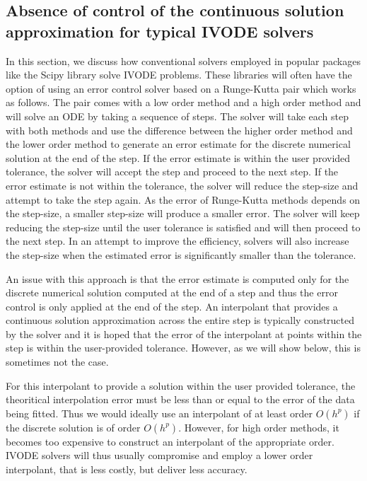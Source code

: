 \subsection{Absence of control of the continuous solution approximation for typical IVODE solvers}
\label{section:end_of_step_innacurate}
In this section, we discuss how conventional solvers employed in popular packages like the Scipy library solve IVODE problems. These libraries will often have the option of using an error control solver based on a Runge-Kutta pair which works as follows. The pair comes with a low order method and a high order method and will solve an ODE by taking a sequence of steps. The solver will take each step with both methods and use the difference between the higher order method and the lower order method to generate an error estimate for the discrete numerical solution at the end of the step. If the error estimate is within the user provided tolerance, the solver will accept the step and proceed to the next step. If the error estimate is not within the tolerance, the solver will reduce the step-size and attempt to take the step again. As the error of Runge-Kutta methods depends on the step-size, a smaller step-size will produce a smaller error. The solver will keep reducing the step-size until the user tolerance is satisfied and will then proceed to the next step. In an attempt to improve the efficiency, solvers will also increase the step-size when the estimated error is significantly smaller than the tolerance.

An issue with this approach is that the error estimate is computed only for the discrete numerical solution computed at the end of a step and thus the error control is only applied at the end of the step. An interpolant that provides a continuous solution approximation across the entire step is typically constructed by the solver and it is hoped that the error of the interpolant at points within the step is within the user-provided tolerance. However, as we will show below, this is sometimes not the case.

For this interpolant to provide a solution within the user provided tolerance, the theoritical interpolation error must be less than or equal to the error of the data being fitted. Thus we would ideally use an interpolant of at least order $O(h^{p})$ if the discrete solution is of order $O(h^{p})$. However, for high order methods, it becomes too expensive to construct an interpolant of the appropriate order. IVODE solvers will thus usually compromise and employ a lower order interpolant, that is less costly, but deliver less accuracy. 

